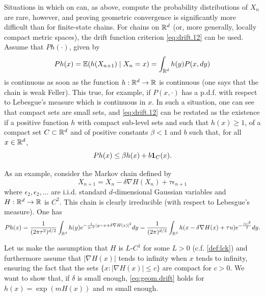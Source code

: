 Situations in which on can, as above, compute the probability distributions of $X_n$ are rare, however, and proving geometric convergence is significantly more difficult than for finite-state chains. For chains on ${\mathbb{R}}^d$ (or, more generally, locally compact metric spaces), the drift function criterion \cref{eq:drift.12} can be used. Assume that $Ph(\cdot)$, given by
\[
Ph(x)  = \bm{\mathbb E}(h(X_{n+1})\mid X_n = x) = \int_{{\mathbb{R}}^d} h(y) P(x, dy)
\]
is continuous as soon as the function $h: {\mathbb{R}}^d \to {\mathbb{R}}$ is continuous (one says that the chain is weak Feller). This true, for example, if $P(x, \cdot)$ has a p.d.f. with respect to Lebesgue's measure which is continuous in $x$. In such a situation, one can see that compact sets are small sets, and \cref{eq:drift.12} can be restated as the existence if  a positive function $h$ with compact sub-level sets and such that $h(x) \geq 1$, of a compact set $C\subset {\mathbb{R}}^d$ and of positive constants $\beta< 1$ and $b$ such that, for all $x\in {\mathbb{R}}^d$,
\begin{equation}
\label{eq:geom.drift}
P h(x) \leq \beta h(x) + b {\bm 1}_C(x).
\end{equation}


As an example, consider the Markov chain defined by
\[
X_{n+1} =X_n  -\delta \nabla H(X_n) + \tau \epsilon_{n+1}
\]
where $\epsilon_2, \epsilon_2,\ldots$ are i.i.d. standard $d$-dimensional Gaussian variables and $H:{\mathbb{R}}^d \to {\mathbb{R}}$ is $C^2$. This chain is clearly irreducible (with respect to Lebesgue's measure). One has
\[
Ph(x) = \frac{1}{(2\pi\tau^2)^{d/2}}\int_{{\mathbb{R}}^d} h(y) e^{-\frac{1}{2\tau^2} |y - x  +\delta \nabla H(x)|^2} dy = \frac{1}{(2\pi)^{d/2}}\int_{{\mathbb{R}}^d} h(x  -\delta \nabla H(x) + \tau u) e^{-\frac{ |u|^2}2} dy.
\]

Let us make the assumption that $H$ is $L$-$C^1$ for some $L>0$ (c.f. \cref{def:lck}) and furthermore assume that $|\nabla H(x)|$ tends to infinity when $x$ tends to infinity, ensuring the fact that the sets $\{x: |\nabla H(x)| \leq c\} $ are compact for $c>0$. We want to show that, if $\delta$ is small enough, \cref{eq:geom.drift} holds for $h(x) = \exp(m H(x))$ and $m$ small enough.

